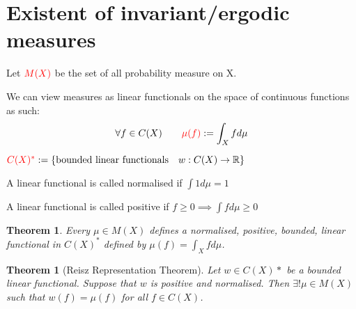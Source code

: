 \documentclass[11pt]{article}
\newcommand{\defeq}{:=}
\newcommand{\R}{\mathbb{R}}
\newenvironment{defin}
	{\begin{mdframed}[backgroundcolor=white, roundcorner=5pt, linewidth=1pt]}
	{\end{mdframed}}
\newcommand{\mdf}[1]{{\color{red} #1}}
\newtheorem{theorem}[prop]{Theorem}
\begin{document}
\section{Existent of invariant/ergodic measures}
\begin{defin}
Let $\mdf{M(X)}$ be the set of all probability measure on X.

We can view measures as linear functionals on the space of continuous functions as such:
$$\forall f\in C(X)\quad\quad \mdf{\mu(f)}\defeq\int_X f d\mu$$

$\mdf{C(X)^*}\defeq\{\text{bounded linear functionals}\quad w:C(X)\to\R\}$

A linear functional is called \mdf{normalised} if $\int 1 d\mu =1$

A linear functional is called \mdf{positive} if $f\geq 0\implies \int f d\mu \geq 0$
\end{defin}
\begin{theorem}
	Every $\mu\in M(X)$ defines a normalised, positive, bounded, linear functional in $C(X)^*$ defined by $\mu(f)=\int_X f d\mu$.
\end{theorem}
\begin{theorem}[Reisz Representation Theorem]
	Let $w\in C(X)*$ be a bounded linear functional. Suppose that $w$ is positive and normalised. Then $\exists !\mu\in M(X)$ such that $w(f)=\mu(f)$ for all $f\in C(X)$.
\end{theorem}
\end{document}
